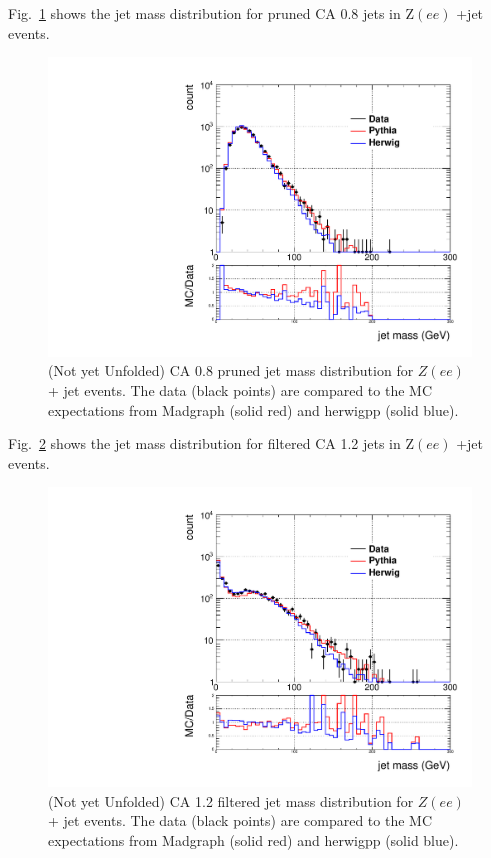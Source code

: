 Fig.~\ref{figs:prunedZeeInt1} shows the jet mass distribution for pruned CA 0.8 jets in Z$(ee)$ +jet events.

\begin{figure}[!htb]
\centering
\includegraphics[width=1.\textwidth]{figs/Zee/jetmassReco_ca8_allpT.pdf}
\caption{(Not yet Unfolded) CA 0.8 pruned jet mass distribution for $Z(ee)$+ jet events. The data (black points) are compared to the MC expectations from Madgraph (solid red) and herwigpp (solid blue).}
\label{figs:prunedZeeInt1}
\end{figure}


Fig.~\ref{figs:filteredZeeInt1} shows the jet mass distribution for filtered CA 1.2 jets in Z$(ee)$ +jet events.

\begin{figure}[!htb]
\centering
\includegraphics[width=1.\textwidth]{figs/Zee/jetmassReco_ca12mdft_allpT.pdf}
\caption{(Not yet Unfolded) CA 1.2 filtered jet mass distribution for $Z(ee)$+ jet events. The data (black points) are compared to the MC expectations from Madgraph (solid red) and herwigpp (solid blue).}
\label{figs:filteredZeeInt1}
\end{figure}


